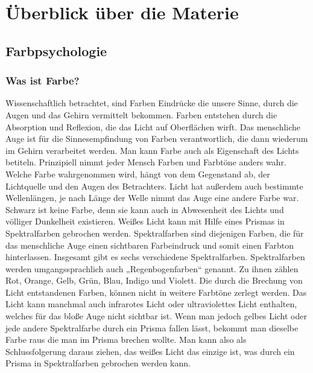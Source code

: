 \chapter{Überblick über die Materie}
\label{cha:sa_Einleitung}


\section{Farbpsychologie}

\subsection{Was ist Farbe?}
Wissenschaftlich betrachtet, sind Farben Eindrücke die unsere Sinne, durch die Augen und das Gehirn vermittelt bekommen. Farben entstehen durch die Absorption und Reflexion, die das Licht auf Oberflächen wirft. Das menschliche Auge ist für die Sinnesempfindung von Farben verantwortlich, die dann wiederum im Gehirn verarbeitet werden. Man kann Farbe auch als Eigenschaft des Lichts betiteln. Prinzipiell nimmt jeder Mensch Farben und Farbtöne anders wahr. Welche Farbe wahrgenommen wird, hängt von dem Gegenstand ab, der Lichtquelle und den Augen des Betrachters. Licht hat außerdem auch bestimmte Wellenlängen, je nach Länge der Welle nimmt das Auge eine andere Farbe war. Schwarz ist keine Farbe, denn sie kann auch in Abwesenheit des Lichts und völliger Dunkelheit existieren. 
Weißes Licht kann mit Hilfe eines Prismas in Spektralfarben gebrochen werden. Spektralfarben sind diejenigen Farben, die für das menschliche Auge einen sichtbaren Farbeindruck und somit einen Farbton hinterlassen. Insgesamt gibt es sechs verschiedene Spektralfarben. Spektralfarben werden umgangssprachlich auch „Regenbogenfarben“ genannt. Zu ihnen zählen Rot, Orange, Gelb, Grün, Blau, Indigo und Violett. Die durch die Brechung von Licht entstandenen Farben, können nicht in weitere Farbtöne zerlegt werden. Das Licht kann manchmal auch infrarotes Licht oder ultraviolettes Licht enthalten, welches für das bloße Auge nicht sichtbar ist. 
Wenn man jedoch gelbes Licht oder jede andere Spektralfarbe durch ein Prisma fallen lässt, bekommt man dieselbe Farbe raus die man im Prisma brechen wollte. Man kann also als Schlussfolgerung daraus ziehen, das weißes Licht das einzige ist, was durch ein Prisma in Spektralfarben gebrochen werden kann. 



